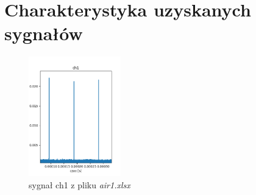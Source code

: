 \documentclass[10pt,a4paper]{article}
\begin{document}
\section{Charakterystyka uzyskanych sygnałów}
\begin{figure}
    \centering
    \includegraphics[width=4cm]{pictures/ch1_1.png}
    \caption{sygnał ch1 z pliku  \textit{air1.xlsx}}
    \label{ch1_1}
\end{figure}
\end{document}
